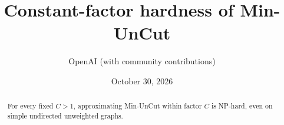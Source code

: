 \documentclass[11pt]{article}
\title{Constant-factor hardness of Min-UnCut}
\author{OpenAI (with community contributions)}
\date{October 30, 2026}
\numberwithin{equation}{section}
\theoremstyle{definition}
\theoremstyle{remark}
\begin{document}
\maketitle
\begin{abstract}
For every fixed \(C>1\), approximating Min-UnCut within factor \(C\) is
NP-hard, even on simple undirected unweighted graphs.
\end{abstract}
\tableofcontents









\end{document}
